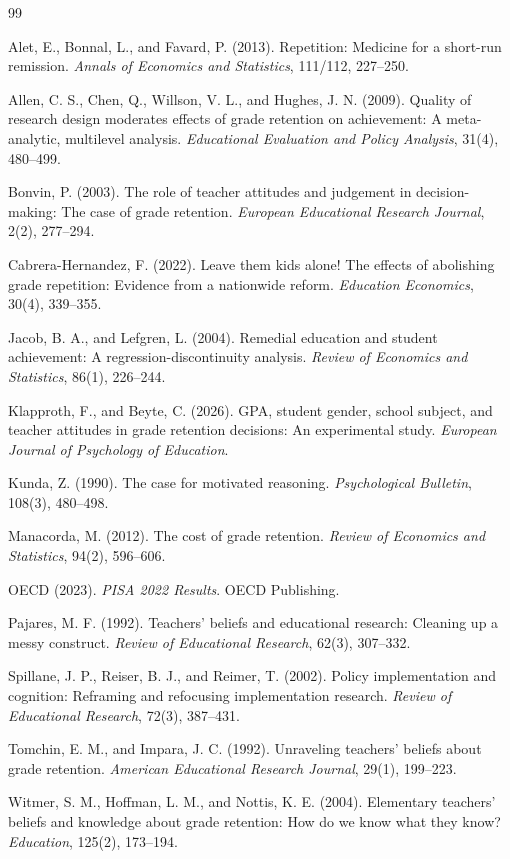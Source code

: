\documentclass[12pt,a4paper]{article}
\begin{document}
\begin{thebibliography}{99}

 Alet, E., Bonnal, L., and Favard, P. (2013). Repetition: Medicine for a short-run remission. \textit{Annals of Economics and Statistics}, 111/112, 227--250.

 Allen, C. S., Chen, Q., Willson, V. L., and Hughes, J. N. (2009). Quality of research design moderates effects of grade retention on achievement: A meta-analytic, multilevel analysis. \textit{Educational Evaluation and Policy Analysis}, 31(4), 480--499.

 Bonvin, P. (2003). The role of teacher attitudes and judgement in decision-making: The case of grade retention. \textit{European Educational Research Journal}, 2(2), 277--294.

 Cabrera-Hernandez, F. (2022). Leave them kids alone! The effects of abolishing grade repetition: Evidence from a nationwide reform. \textit{Education Economics}, 30(4), 339--355.

 Jacob, B. A., and Lefgren, L. (2004). Remedial education and student achievement: A regression-discontinuity analysis. \textit{Review of Economics and Statistics}, 86(1), 226--244.

 Klapproth, F., and Beyte, C. (2026). GPA, student gender, school subject, and teacher attitudes in grade retention decisions: An experimental study. \textit{European Journal of Psychology of Education}.

 Kunda, Z. (1990). The case for motivated reasoning. \textit{Psychological Bulletin}, 108(3), 480--498.

 Manacorda, M. (2012). The cost of grade retention. \textit{Review of Economics and Statistics}, 94(2), 596--606.

 OECD (2023). \textit{PISA 2022 Results}. OECD Publishing.

 Pajares, M. F. (1992). Teachers' beliefs and educational research: Cleaning up a messy construct. \textit{Review of Educational Research}, 62(3), 307--332.

 Spillane, J. P., Reiser, B. J., and Reimer, T. (2002). Policy implementation and cognition: Reframing and refocusing implementation research. \textit{Review of Educational Research}, 72(3), 387--431.

 Tomchin, E. M., and Impara, J. C. (1992). Unraveling teachers' beliefs about grade retention. \textit{American Educational Research Journal}, 29(1), 199--223.

 Witmer, S. M., Hoffman, L. M., and Nottis, K. E. (2004). Elementary teachers' beliefs and knowledge about grade retention: How do we know what they know? \textit{Education}, 125(2), 173--194.

\end{thebibliography}
\end{document}
